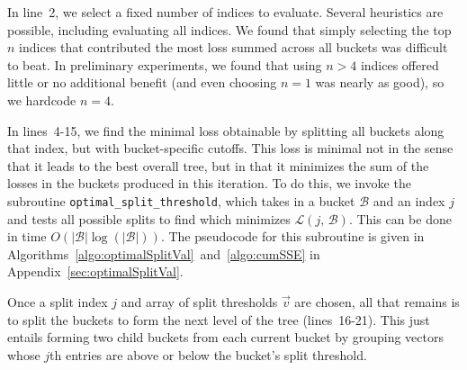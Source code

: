 In line~2, we select a fixed number of indices to evaluate. Several heuristics are possible, including evaluating all indices. We found that simply selecting the top $n$ indices that contributed the most loss summed across all buckets was difficult to beat. In preliminary experiments, we found that using $n > 4$ indices offered little or no additional benefit (and even choosing $n = 1$ was nearly as good), so we hardcode $n = 4$.

In lines~4-15, we find the minimal loss obtainable by splitting all buckets along that index, but with bucket-specific cutoffs. This loss is minimal not in the sense that it leads to the best overall tree, but in that it minimizes the sum of the losses in the buckets produced in this iteration. To do this, we invoke the subroutine \texttt{optimal\_split\_threshold}, which takes in a bucket $\mathcal{B}$ and an index $j$ and tests all possible splits to find which minimizes $\mathcal{L}(j \text{, } \mathcal{B})$. This can be done in time $O(|\mathcal{B}| \log(|\mathcal{B}|))$. The pseudocode for this subroutine is given in Algorithms~\ref{algo:optimalSplitVal}~and~\ref{algo:cumSSE} in Appendix~\ref{sec:optimalSplitVal}.

Once a split index $j$ and array of split thresholds $\vec{v}$ are chosen, all that remains is to split the buckets to form the next level of the tree (lines~16-21). This just entails forming two child buckets from each current bucket by grouping vectors whose $j$th entries are above or below the bucket's split threshold.%


